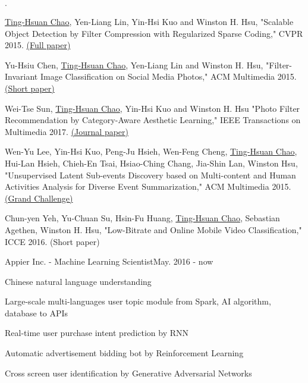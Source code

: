 \documentclass{joel_cv}
\begin{document}
\begin{sectionItemize}{$\cdot$}
	\item \underline{Ting-Hsuan Chao}, Yen-Liang Lin, Yin-Hsi Kuo and Winston H. Hsu, "Scalable Object Detection by Filter Compression with Regularized Sparse Coding," CVPR 2015. \href{http://www.cv-foundation.org/openaccess/content_cvpr_2015/html/Chao_Scalable_Object_Detection_2015_CVPR_paper.html}{(Full paper)}
	
	\item Yu-Hsiu Chen, \underline{Ting-Hsuan Chao}, Yen-Liang Lin and Winston H. Hsu, "Filter-Invariant Image Classification on Social Media Photos," ACM Multimedia 2015. \href{http://dl.acm.org/citation.cfm?id=2806348}{(Short paper)}
	
	\item Wei-Tse Sun, \underline{Ting-Hsuan Chao}, Yin-Hsi Kuo and Winston H. Hsu "Photo Filter Recommendation by Category-Aware Aesthetic Learning," IEEE Transactions on Multimedia 2017. \href{http://joelthchao.github.io/pdf/photo_sun_tmm_2017.pdf}{(Journal paper)}
	
	\item Wen-Yu Lee, Yin-Hsi Kuo, Peng-Ju Hsieh, Wen-Feng Cheng, \underline{Ting-Hsuan Chao}, Hui-Lan Hsieh, Chieh-En Tsai, Hsiao-Ching Chang, Jia-Shin Lan, Winston Hsu, "Unsupervised Latent Sub-events Discovery based on Multi-content and Human Activities Analysis for Diverse Event Summarization,"  ACM Multimedia 2015. \href{http://dl.acm.org/citation.cfm?id=2809935}{(Grand Challenge)}
	
	\item Chun-yen Yeh, Yu-Chuan Su, Hsin-Fu Huang, \underline{Ting-Hsuan Chao}, Sebastian Agethen, Winston H. Hsu, "Low-Bitrate and Online Mobile Video Classification," ICCE 2016. (Short paper)
\end{sectionItemize}

%
%

\begin{profExp}{Appier Inc. - Machine Learning Scientist}{May. 2016 - now}
	\item Chinese natural language understanding
	\item Large-scale multi-languages user topic module from Spark, AI algorithm, database to APIs
	\item Real-time user purchase intent prediction by RNN
	\item Automatic advertisement bidding bot by Reinforcement Learning
	\item Cross screen user identification by Generative Adversarial Networks
\end{profExp}
\end{document}
